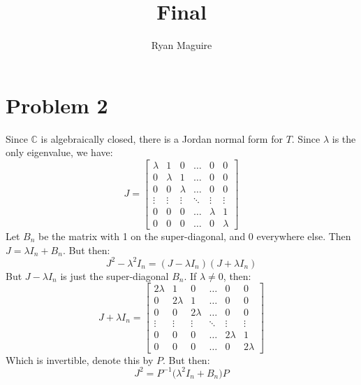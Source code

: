 \documentclass[crop=false,class=article]{standalone}                           %
\begin{document}
    \title{Final}
    \author{Ryan Maguire}
    \date{\vspace{-5ex}}
    \maketitle
    \section*{Problem 2}
    \setcounter{section}{2}
    Since $\mathbb{C}$ is algebraically closed, there is a Jordan normal form
    for $T$. Since $\lambda$ is the only eigenvalue, we have:
    \begin{equation}
        J=
        \begin{bmatrix}
            \lambda&1&0&\dots&0&0\\
            0&\lambda&1&\dots&0&0\\
            0&0&\lambda&\dots&0&0\\
            \vdots&\vdots&\vdots&\ddots&\vdots&\vdots\\
            0&0&0&\dots&\lambda&1\\
            0&0&0&\dots&0&\lambda
        \end{bmatrix}
    \end{equation}
    Let $B_{n}$ be the matrix with 1 on the super-diagonal, and 0 everywhere
    else. Then $J=\lambda{I}_{n}+B_{n}$. But then:
    \begin{equation}
        J^{2}-\lambda^{2}I_{n}=(J-\lambda{I}_{n})(J+\lambda{I}_{n})
    \end{equation}
    But $J-\lambda{I}_{n}$ is just the super-diagonal $B_{n}$. If
    $\lambda\ne{0}$, then:
    \begin{equation}
        J+\lambda{I}_{n}=
        \begin{bmatrix}
            2\lambda&1&0&\dots&0&0\\
            0&2\lambda&1&\dots&0&0\\
            0&0&2\lambda&\dots&0&0\\
            \vdots&\vdots&\vdots&\ddots&\vdots&\vdots\\
            0&0&0&\dots&2\lambda&1\\
            0&0&0&\dots&0&2\lambda
        \end{bmatrix}
    \end{equation}
    Which is invertible, denote this by $P$. But then:
    \begin{equation}
        J^{2}=P^{\minus{1}}\big(\lambda^{2}I_{n}+B_{n}\big)P
    \end{equation}
\end{document}
